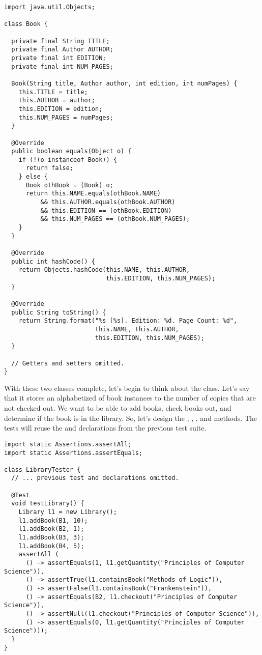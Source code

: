 \begin{lstlisting}[language=MyJava]
import java.util.Objects;

class Book {

  private final String TITLE;
  private final Author AUTHOR;
  private final int EDITION;
  private final int NUM_PAGES;

  Book(String title, Author author, int edition, int numPages) {
    this.TITLE = title;
    this.AUTHOR = author;
    this.EDITION = edition;
    this.NUM_PAGES = numPages;
  }

  @Override
  public boolean equals(Object o) {
    if (!(o instanceof Book)) {
      return false;
    } else {
      Book othBook = (Book) o;
      return this.NAME.equals(othBook.NAME)
          && this.AUTHOR.equals(othBook.AUTHOR)
          && this.EDITION == (othBook.EDITION)
          && this.NUM_PAGES == (othBook.NUM_PAGES);
    }
  }
  
  @Override
  public int hashCode() {
    return Objects.hashCode(this.NAME, this.AUTHOR, 
                            this.EDITION, this.NUM_PAGES);
  }

  @Override
  public String toString() {
    return String.format("%s [%s]. Edition: %d. Page Count: %d",
                         this.NAME, this.AUTHOR, 
                         this.EDITION, this.NUM_PAGES);
  }

  // Getters and setters omitted.
}
\end{lstlisting}

With these two classes complete, let's begin to think about the  class. 
Let's say that it stores an alphabetized  of book instances to the number of copies that are not checked out. 
We want to be able to add books, check books out, and determine if the book is in the library.
So, let's design the , , , and  methods.
The tests will reuse the  and  declarations from the previous test suite.

\begin{lstlisting}[language=MyJava]
import static Assertions.assertAll;
import static Assertions.assertEquals;

class LibraryTester {
  // ... previous test and declarations omitted.

  @Test
  void testLibrary() {
    Library l1 = new Library();
    l1.addBook(B1, 10);
    l1.addBook(B2, 1);
    l1.addBook(B3, 3);
    l1.addBook(B4, 5);
    assertAll (
      () -> assertEquals(1, l1.getQuantity("Principles of Computer Science")),
      () -> assertTrue(l1.containsBook("Methods of Logic")),
      () -> assertFalse(l1.containsBook("Frankenstein")),
      () -> assertEquals(B2, l1.checkout("Principles of Computer Science")),
      () -> assertNull(l1.checkout("Principles of Computer Science")),
      () -> assertEquals(0, l1.getQuantity("Principles of Computer Science")));
  }
}
\end{lstlisting}

